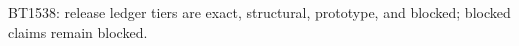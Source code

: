 \begin{center}\small
BT1538: release ledger tiers are exact, structural, prototype, and blocked; blocked claims remain blocked.
\end{center}
